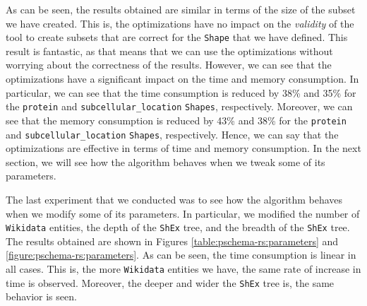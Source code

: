 As can be seen, the results obtained are similar in terms of the size of the subset we have created. This is, the optimizations have no impact on the \textit{validity} of the tool to create subsets that are correct for the \texttt{Shape} that we have defined. This result is fantastic, as that means that we can use the optimizations without worrying about the correctness of the results. However, we can see that the optimizations have a significant impact on the time and memory consumption. In particular, we can see that the time consumption is reduced by 38\% and 35\% for the \texttt{protein} and \texttt{subcellular\_location} \texttt{Shapes}, respectively. Moreover, we can see that the memory consumption is reduced by 43\% and 38\% for the \texttt{protein} and \texttt{subcellular\_location} \texttt{Shapes}, respectively. Hence, we can say that the optimizations are effective in terms of time and memory consumption. In the next section, we will see how the algorithm behaves when we tweak some of its parameters.

The last experiment that we conducted was to see how the algorithm behaves when we modify some of its parameters. In particular, we modified the number of \texttt{Wikidata} entities, the depth of the \texttt{ShEx} tree, and the breadth of the \texttt{ShEx} tree. The results obtained are shown in Figures \ref{table:pschema-rs:parameters} and \ref{figure:pschema-rs:parameters}. As can be seen, the time consumption is linear in all cases. This is, the more \texttt{Wikidata} entities we have, the same rate of increase in time is observed.  Moreover, the deeper and wider the \texttt{ShEx} tree is, the same behavior is seen.

